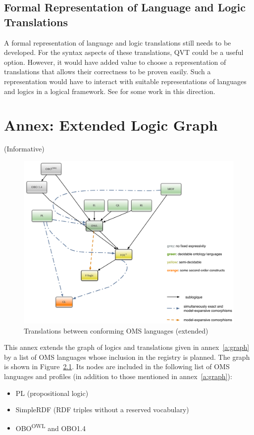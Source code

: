 \documentclass[10pt,fleqn,final]{scrreprt}
\newcommand{\annexrefname}{annex}
\newcommand{\figurerefname}{Figure}
\newcommand{\aref}[1]{\annexrefname~\ref{#1}}
\newcommand{\fref}[1]{\figurerefname~\ref{#1}}
\newcommand{\informative}[0]{{\begin{center}{\Large{(Informative})}\end{center}} \bigskip}
\newcommand{\sclause}[1]{\section{#1}}
\newcommand{\infannex}[1]{ \chapter{Annex: #1}  \informative }
\newenvironment{definitions}[0]{\medskip }{}
\begin{document}
\begin{definitions}
\sclause{Formal Representation of Language and Logic Translations}
\label{sec:repr-trans}

A formal representation of language and logic translations still needs
to be developed. For the syntax aspects of these translations, QVT
could be a useful option. However, it would have added value to choose
a representation of translations that allows  their correctness
to be proven easily. Such a representation would have to interact
with suitable representations of languages and logics in a 
logical framework. See \cite{CodescuEtAl2011d} for some work
in this direction.


\infannex{Extended Logic Graph}\label{a:ext-graph}

\begin{figure}
  \centering
  \includegraphics[width=\textwidth]{illustrations/pre-reduced-ontograph}
  \caption{Translations between conforming OMS languages (extended)}
  \label{fig:pre-ontograph}
\end{figure}
This annex extends the graph of logics and translations given in
\aref{a:graph} by a list of OMS languages  whose inclusion in
the registry is planned.  The graph is shown in
\fref{fig:pre-ontograph}.  Its nodes are included in the following
list of OMS languages and profiles (in addition to those
mentioned in \aref{a:graph}):
\begin{itemize}
\item PL (propositional logic)
\item SimpleRDF (RDF triples without a reserved vocabulary)
\item OBO\textsuperscript{OWL} and OBO1.4

\end{itemize}
\end{definitions}
\end{document}
